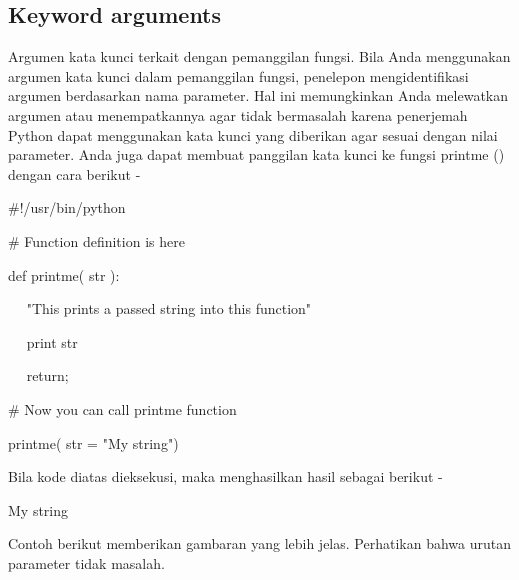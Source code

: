 \documentclass[a4paper,12pt]{report}
\begin{document}
\subsection*{Keyword arguments}
 \par
\begin{adjustwidth}{0.03in}{0.03in}
Argumen kata kunci terkait dengan pemanggilan fungsi. Bila Anda menggunakan argumen kata kunci dalam pemanggilan fungsi, penelepon mengidentifikasi argumen berdasarkan nama parameter. Hal ini memungkinkan Anda melewatkan argumen atau menempatkannya agar tidak bermasalah karena penerjemah Python dapat menggunakan kata kunci yang diberikan agar sesuai dengan nilai parameter. Anda juga dapat membuat panggilan kata kunci ke fungsi printme () dengan cara berikut -\end{adjustwidth}
 \par
\noindent 
 \hspace*{0.5in}  $  \#  $!/usr/bin/python \par
\vspace{12pt}
\noindent 
 \hspace*{0.5in}  $  \#  $ Function definition is here \par
\noindent 
 \hspace*{0.5in} def printme( str ): \par
\noindent 
 \hspace*{0.5in} ~~ "This prints a passed string into this function" \par
\noindent 
 \hspace*{0.5in} ~~ print str \par
\noindent 
 \hspace*{0.5in} ~~ return; \par
\vspace{12pt}
\noindent 
 \hspace*{0.5in}  $  \#  $ Now you can call printme function \par
\noindent 
 \hspace*{0.5in} printme( str = "My string") \par
\begin{adjustwidth}{0.03in}{0.03in}
Bila kode diatas dieksekusi, maka menghasilkan hasil sebagai berikut -\end{adjustwidth}
 \par
\noindent 
 \hspace*{0.5in} My string \par
\begin{adjustwidth}{0.03in}{0.03in}
Contoh berikut memberikan gambaran yang lebih jelas. Perhatikan bahwa urutan parameter tidak masalah.\end{adjustwidth}
\end{document}
